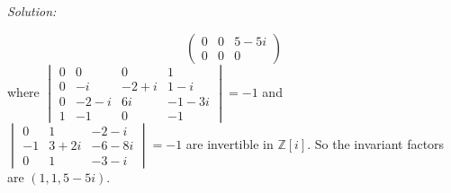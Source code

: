 \documentclass[a4paper, 12pt]{article}
\newenvironment{solution}
    {\textit{Solution:}}
    {}
\begin{document}
\begin{solution}
\begin{enumerate}[(a)]
\[\begin{pmatrix}
	0&0&5-5i\\ 
	0&0&0
\end{pmatrix}\]
where \(\begin{vmatrix}
	0&0&0&1\\ 
	0&-i&-2+i&1-i\\ 
	0&-2-i&6i&-1-3i\\ 
	1&-1&0&-1
\end{vmatrix}=-1\) and \(\begin{vmatrix}
	0&1&-2-i\\ 
	-1&3+2i&-6-8i\\ 
	0&1&-3-i
\end{vmatrix}=-1\) are invertible in \(\mathbb{Z}[i]\). So the invariant factors are \((1,1,5-5i)\).
\end{enumerate} 
\end{solution}
\end{document}

